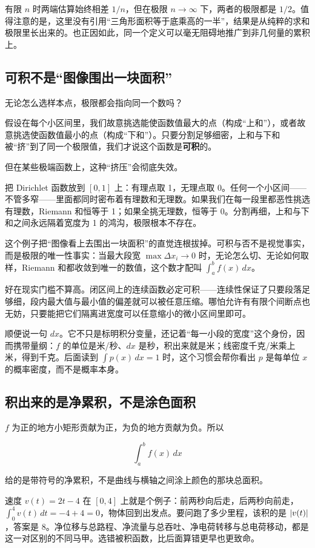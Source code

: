 有限 \(n\) 时两端估算始终相差 \(1/n\)，但在极限 \(n \to \infty\) 下，两者的极限都是 \(1/2\)。值得注意的是，这里没有引用``三角形面积等于底乘高的一半''，结果是从纯粹的求和极限里长出来的。也正因如此，同一个定义可以毫无阻碍地推广到非几何量的累积上。

\subsection{可积不是``图像围出一块面积''}

无论怎么选样本点，极限都会指向同一个数吗？

假设在每个小区间里，我们故意挑选能使函数值最大的点（构成``上和''），或者故意挑选使函数值最小的点（构成``下和''）。只要分割足够细密，上和与下和被``挤''到了同一个极限值，我们才说这个函数是\textbf{可积}的。

但在某些极端函数上，这种``挤压''会彻底失效。

把 Dirichlet 函数放到 \([0,1]\) 上：有理点取 1，无理点取 0。任何一个小区间——不管多窄——里面都同时密布着有理数和无理数。如果我们在每一段里都恶性挑选有理数，Riemann 和恒等于 1；如果全挑无理数，恒等于 0。分割再细，上和与下和之间永远隔着宽度为 1 的鸿沟，极限根本不存在。

这个例子把``图像看上去围出一块面积''的直觉连根拔掉。可积与否不是视觉事实，而是极限的唯一性事实：当最大段宽 \(\max\Delta x_i\to0\) 时，无论怎么切、无论如何取样，Riemann 和都收敛到唯一的数值，这个数才配叫 \(\int_a^b f(x)\,dx\)。

好在现实门槛不算高。闭区间上的连续函数必定可积——连续性保证了只要段落足够细，段内最大值与最小值的偏差就可以被任意压缩。哪怕允许有有限个间断点也无妨，只要能把它们隔离进宽度可以任意缩小的微小区间里即可。

顺便说一句 \(dx\)。它不只是标明积分变量，还记着``每一小段的宽度''这个身份，因而携带量纲：\(f\) 的单位是米/秒、\(dx\) 是秒，积出来就是米；线密度千克/米乘上米，得到千克。后面读到 \(\int p(x)\,dx=1\) 时，这个习惯会帮你看出 \(p\) 是每单位 \(x\) 的概率密度，而不是概率本身。

\subsection{积出来的是净累积，不是涂色面积}

\(f\) 为正的地方小矩形贡献为正，为负的地方贡献为负。所以

\[
\int_a^b f(x)\,dx
\]

给的是带符号的净累积，不是曲线与横轴之间涂上颜色的那块总面积。

速度 \(v(t)=2t-4\) 在 \([0,4]\) 上就是个例子：前两秒向后走，后两秒向前走，\(\int_0^4 v(t)\,dt=-4+4=0\)，物体回到出发点。要问跑了多少里程，该积的是 \(\left|v(t)\right|\)，答案是 8。净位移与总路程、净流量与总吞吐、净电荷转移与总电荷移动，都是这一对区别的不同马甲。选错被积函数，比后面算错更早也更致命。

